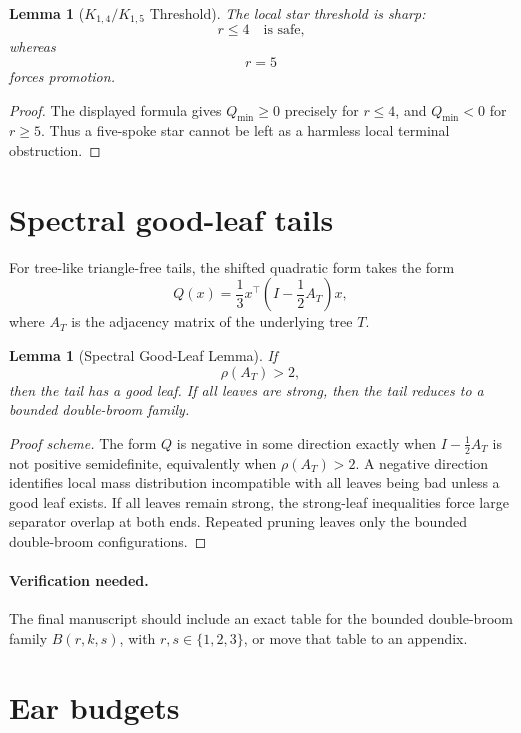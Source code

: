 \documentclass[11pt]{article}
\newtheorem{lemma}[theorem]{Lemma}
\theoremstyle{definition}
\begin{document}
\begin{lemma}[\(K_{1,4}/K_{1,5}\) Threshold]\label{lem:k14-k15}
The local star threshold is sharp:
\[
    r\le4
    \quad\text{is safe,}
\]
whereas
\[
    r=5
\]
forces promotion.
\end{lemma}

\begin{proof}
The displayed formula gives \(Q_{\min}\ge0\) precisely for \(r\le4\), and \(Q_{\min}<0\) for \(r\ge5\). Thus a five-spoke star cannot be left as a harmless local terminal obstruction.
\end{proof}

\section{Spectral good-leaf tails}

For tree-like triangle-free tails, the shifted quadratic form takes the form
\[
    Q(x)=
    \frac13x^\top
    \left(I-\frac12A_T\right)x,
\]
where \(A_T\) is the adjacency matrix of the underlying tree \(T\).

\begin{lemma}[Spectral Good-Leaf Lemma]\label{lem:spectral-good-leaf}
If
\[
    \rho(A_T)>2,
\]
then the tail has a good leaf. If all leaves are strong, then the tail reduces to a bounded double-broom family.
\end{lemma}

\begin{proof}[Proof scheme]
The form \(Q\) is negative in some direction exactly when \(I-\frac12A_T\) is not positive semidefinite, equivalently when \(\rho(A_T)>2\). A negative direction identifies local mass distribution incompatible with all leaves being bad unless a good leaf exists. If all leaves remain strong, the strong-leaf inequalities force large separator overlap at both ends. Repeated pruning leaves only the bounded double-broom configurations.
\end{proof}

\paragraph{Verification needed.}
The final manuscript should include an exact table for the bounded double-broom family \(B(r,k,s)\), with \(r,s\in\{1,2,3\}\), or move that table to an appendix.

\section{Ear budgets}
\end{document}

